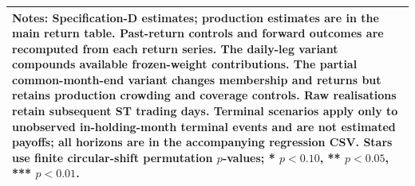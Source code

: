 \begin{tabular}{lllcccc}
\midrule
\multicolumn{7}{l}{\parbox{\dimexpr\textwidth-10pt\relax}{\footnotesize Notes: Specification-D estimates; production estimates are in the main return table. Past-return controls and forward outcomes are recomputed from each return series. The daily-leg variant compounds available frozen-weight contributions. The partial common-month-end variant changes membership and returns but retains production crowding and coverage controls. Raw realisations retain subsequent ST trading days. Terminal scenarios apply only to unobserved in-holding-month terminal events and are not estimated payoffs; all horizons are in the accompanying regression CSV. Stars use finite circular-shift permutation $p$-values; * $p<0.10$, ** $p<0.05$, *** $p<0.01$.}} \\
\bottomrule
\end{tabular}

\endgroup